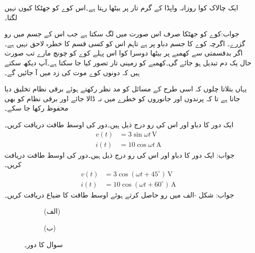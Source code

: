 ایک چالاک کوا روزانہ واپڈا کے   گرم تار پر بیٹھا رہتا ہے۔اس کوے کو جھٹکا کیوں نہیں لگتا۔

جواب:کوے کو جھٹکا صرف اس صورت میں لگ سکتا ہے جب اس کے جسم میں رو گزرے۔ اگرچہ کوے کا جسم  دباو پر ہے تاہم اس کو کسی قسم کا خطرہ لاحق نہیں ہے۔اگر بدقسمتی سے کھمبے پر بیٹھا دوسرا کوا اس پہلے کوے کو چونچ مارے تب صورت حال یک دم تبدیل ہو جائے گی۔کھمبے کو زمینی تار تصور کیا جا سکتا ہے۔آپ دیکھ سکتے ہیں کہ دونوں کوے موت کی زد میں آ جائیں گے۔

یہاں بتلاتا چلوں کہ اسی طرح کے مسائل کو مد نظر رکھتے ہوئے برقی نظام  تخلیق دیا جاتا ہے تا کہ پرندوں اور جانوروں کو خطرے  میں نہ ڈالا جائے اور برقی نظام کو بھی محفوظ رکھا جا سکے۔

ایک دور کا دباو اور اس کی رو درج ذیل ہیں۔دور کی اوسط طاقت دریافت کریں۔
\begin{align*}
v(t)&=3\sin \omega t \, \si{\volt}\\
i(t)&=10\cos \omega t \,\si{\ampere}
\end{align*}
جواب:
ایک دور کا دباو اور اس کی رو درج ذیل ہیں۔دور کی اوسط طاقت دریافت کریں۔
\begin{align*}
v(t)&=3\cos (\omega t+45^{\circ}) \, \si{\volt}\\
i(t)&=10\cos (\omega t+60^{\circ}) \,\si{\ampere}
\end{align*}
جواب:
شکل -الف میں رو حاصل کرتے ہوئے اوسط طاقت کا ضیاع دریافت کریں۔
\begin{figure}
\centering
\begin{subfigure}{0.4\textwidth}
\centering
{}
\caption*{(الف)}
\end{subfigure}%
\begin{subfigure}{0.6\textwidth}
\centering
{}
\caption*{(ب)}
\end{subfigure}%
\caption{سوال  کا دور۔}
\label{شکل_سوال_طاقت_الف}
\end{figure}

